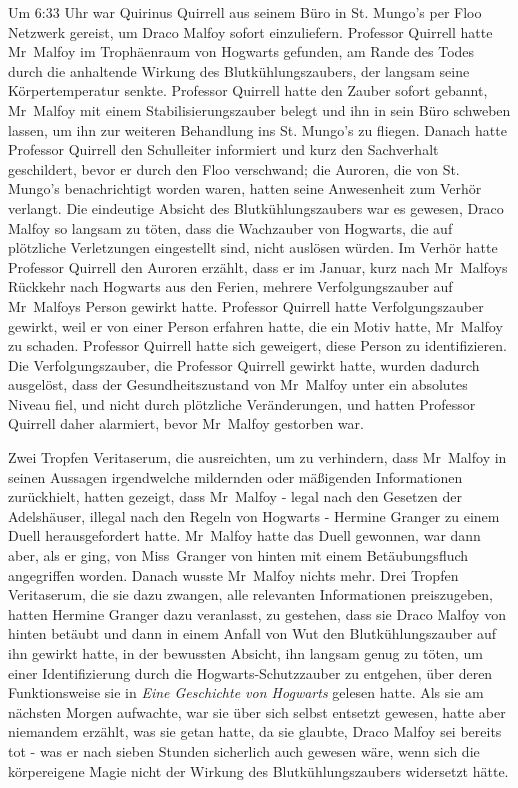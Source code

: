{Um 6:33 Uhr war Quirinus Quirrell aus seinem Büro in St. Mungo's per Floo Netzwerk gereist, um Draco Malfoy sofort einzuliefern. Professor Quirrell hatte Mr~Malfoy im Trophäenraum von Hogwarts gefunden, am Rande des Todes durch die anhaltende Wirkung des Blutkühlungszaubers, der langsam seine Körpertemperatur senkte. Professor Quirrell hatte den Zauber sofort gebannt, Mr~Malfoy mit einem Stabilisierungszauber belegt und ihn in sein Büro schweben lassen, um ihn zur weiteren Behandlung ins St. Mungo's zu fliegen. Danach hatte Professor Quirrell den Schulleiter informiert und kurz den Sachverhalt geschildert, bevor er durch den Floo verschwand; die Auroren, die von St. Mungo's benachrichtigt worden waren, hatten seine Anwesenheit zum Verhör verlangt. Die eindeutige Absicht des Blutkühlungszaubers war es gewesen, Draco Malfoy so langsam zu töten, dass die Wachzauber von Hogwarts, die auf plötzliche Verletzungen eingestellt sind, nicht auslösen würden. Im Verhör hatte Professor Quirrell den Auroren erzählt, dass er im Januar, kurz nach Mr~Malfoys Rückkehr nach Hogwarts aus den Ferien, mehrere Verfolgungszauber auf Mr~Malfoys Person gewirkt hatte. Professor Quirrell hatte Verfolgungszauber gewirkt, weil er von einer Person erfahren hatte, die ein Motiv hatte, Mr~Malfoy zu schaden. Professor Quirrell hatte sich geweigert, diese Person zu identifizieren. Die Verfolgungszauber, die Professor Quirrell gewirkt hatte, wurden dadurch ausgelöst, dass der Gesundheitszustand von Mr~Malfoy unter ein absolutes Niveau fiel, und nicht durch plötzliche Veränderungen, und hatten Professor Quirrell daher alarmiert, bevor Mr~Malfoy gestorben war.

Zwei Tropfen Veritaserum, die ausreichten, um zu verhindern, dass Mr~Malfoy in seinen Aussagen irgendwelche mildernden oder mäßigenden Informationen zurückhielt, hatten gezeigt, dass Mr~Malfoy - legal nach den Gesetzen der Adelshäuser, illegal nach den Regeln von Hogwarts - Hermine Granger zu einem Duell herausgefordert hatte. Mr~Malfoy hatte das Duell gewonnen, war dann aber, als er ging, von Miss~Granger von hinten mit einem Betäubungsfluch angegriffen worden. Danach wusste Mr~Malfoy nichts mehr. Drei Tropfen Veritaserum, die sie dazu zwangen, alle relevanten Informationen preiszugeben, hatten Hermine Granger dazu veranlasst, zu gestehen, dass sie Draco Malfoy von hinten betäubt und dann in einem Anfall von Wut den Blutkühlungszauber auf ihn gewirkt hatte, in der bewussten Absicht, ihn langsam genug zu töten, um einer Identifizierung durch die Hogwarts-Schutzzauber zu entgehen, über deren Funktionsweise sie in \emph{Eine Geschichte von Hogwarts} gelesen hatte. Als sie am nächsten Morgen aufwachte, war sie über sich selbst entsetzt gewesen, hatte aber niemandem erzählt, was sie getan hatte, da sie glaubte, Draco Malfoy sei bereits tot - was er nach sieben Stunden sicherlich auch gewesen wäre, wenn sich die körpereigene Magie nicht der Wirkung des Blutkühlungszaubers widersetzt hätte.

}
